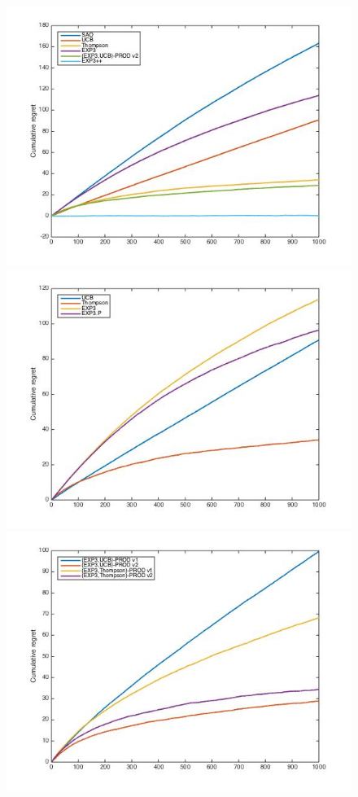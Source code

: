 \documentclass[10.5pt]{article}
\begin{document}
\begin{figure}[H]
  \includegraphics[width=\linewidth]{Stoch1_mix.jpg}
  \label{fig:awesome_image1}
\endminipage\hfill
{}
  \includegraphics[width=\linewidth]{Stoch1_old.jpg}
  \label{fig:awesome_image2}
\endminipage\hfill
{}%
  \includegraphics[width=\linewidth]{Stoch1_prod.jpg}

\end{figure}
\end{document}
